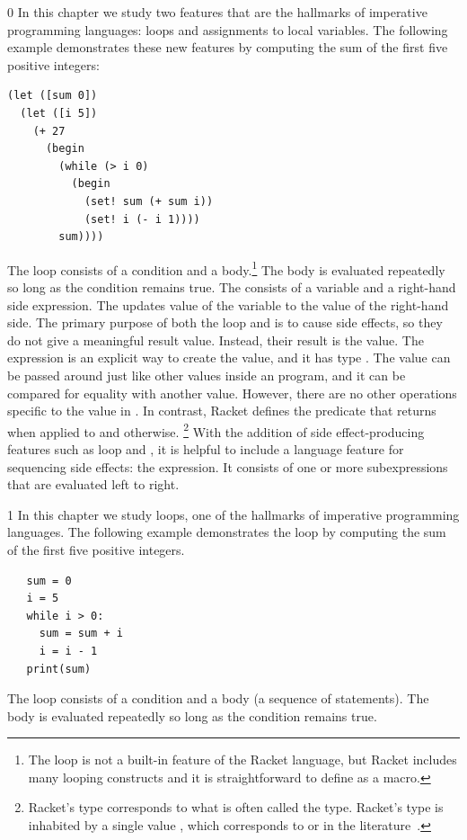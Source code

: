 \documentclass[7x10]{TimesAPriori_MIT}%
\def\racketEd{0}
\def\pythonEd{1}
\providecommand{\BookEdition}{1}
\let\edition\BookEdition
\newcommand{\pythonColor}[0]{}
\numberwithin{theorem}{chapter}
\numberwithin{definition}{chapter}
\numberwithin{equation}{chapter}
\begin{document}
{\if\edition\racketEd
%
In this chapter we study two features that are the hallmarks of
imperative programming languages: loops and assignments to local
variables. The following example demonstrates these new features by
computing the sum of the first five positive integers:
\begin{lstlisting}
(let ([sum 0])
  (let ([i 5])
    (+ 27
      (begin
        (while (> i 0)
          (begin
            (set! sum (+ sum i))
            (set! i (- i 1))))
        sum))))
\end{lstlisting}
The  loop consists of a condition and a
body.\footnote{The  loop is not a built-in
feature of the Racket language, but Racket includes many looping
constructs and it is straightforward to define  as a
macro.} The body is evaluated repeatedly so long as the condition
remains true.
%
The  consists of a variable and a right-hand side
expression.  The  updates value of the variable to the
value of the right-hand side.
%
The primary purpose of both the  loop and  is
to cause side effects, so they do not give a meaningful result
value. Instead, their result is the  value.  The
expression  is an explicit way to create the
 value, and it has type .  The
 value can be passed around just like other values
inside an \LangLoop{} program, and it can be compared for equality with
another  value. However, there are no other operations
specific to the  value in \LangLoop{}. In contrast,
Racket defines the   predicate that returns 
when applied to  and  otherwise.%
%
\footnote{Racket's  type corresponds to what is often
  called the  type. Racket's  type is inhabited
  by a single value , which corresponds to 
  or \code{()} in the literature~\citep{Pierce:2002hj}.}
%
With the addition of side effect-producing features such as
 loop and , it is helpful to include a language
feature for sequencing side effects: the  expression. It
consists of one or more subexpressions that are evaluated
left to right.
%
\fi}

{\if\edition\pythonEd\pythonColor
%
In this chapter we study loops, one of the hallmarks of imperative
programming languages. The following example demonstrates the
 loop by computing the sum of the first five positive
integers.
\begin{lstlisting}
   sum = 0
   i = 5
   while i > 0:
     sum = sum + i
     i = i - 1
   print(sum)
\end{lstlisting}
The  loop consists of a condition and a body (a sequence
of statements). The body is evaluated repeatedly so long as the
condition remains true.
%
\fi}
\end{document}
